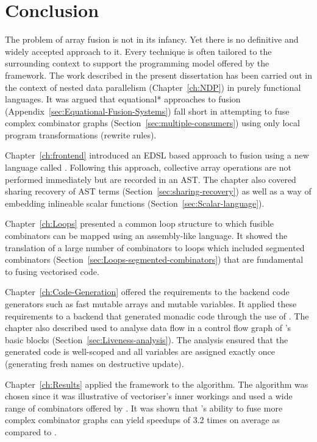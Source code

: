 \documentclass[preamble.tex]{subfiles}
\begin{document}
\clearpage

\chapter{Conclusion}

The problem of array fusion is not in its infancy. Yet there is no definitive and widely accepted approach to it. Every technique is often tailored to the surrounding context to support the programming model offered by the framework. The work described in the present dissertation has been carried out in the context of nested data parallelism (Chapter~\ref{ch:NDP}) in purely functional languages. It was argued that \*equational* approaches to fusion (Appendix~\ref{sec:Equational-Fusion-Systems}) fall short in attempting to fuse complex combinator graphs (Section~\ref{sec:multiple-consumers}) using only local program transformations (rewrite rules).

Chapter~\ref{ch:frontend} introduced an EDSL based approach to fusion using a new language called \LiveFusion. Following this approach, collective array operations are not performed immediately but are recorded in an AST. The chapter also covered sharing recovery of AST terms (Section~\ref{sec:sharing-recovery}) as well as a way of embedding inlineable scalar functions (Section~\ref{sec:Scalar-language}).

Chapter~\ref{ch:Loops} presented a common loop structure to which fusible combinators can be mapped using an assembly-like \Loop language. It showed the translation of a large number of combinators to loops which included segmented combinators (Section~\ref{sec:Loops-segmented-combinators}) that are fundamental to fusing vectorised code.

Chapter~\ref{ch:Code-Generation} offered the requirements to the backend code generators such as fast mutable arrays and mutable variables. It applied these requirements to a backend that generated monadic \Haskell code through the use of . The chapter also described  used to analyse data flow in a control flow graph of \Loop's basic blocks (Section~\ref{sec:Liveness-analysis}). The analysis ensured that the generated code is well-scoped and all variables are assigned exactly once (generating fresh names on destructive update).

Chapter~\ref{ch:Results} applied the \LiveFusion framework to the \QuickHull algorithm. The algorithm was chosen since it was illustrative of \DPH vectoriser's inner workings and used a wide range of combinators offered by \LiveFusion. It was shown that \LiveFusion's ability to fuse more complex combinator graphs can yield speedups of 3.2 times on average as compared to \StreamFusion.
\end{document}
